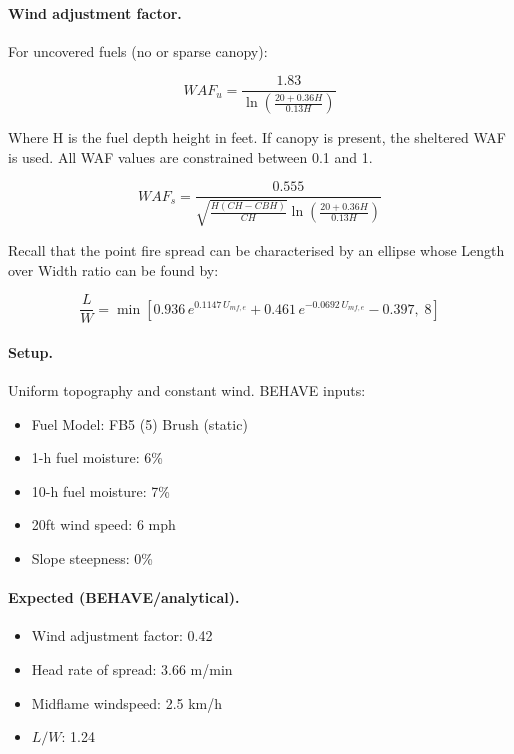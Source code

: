 \paragraph{Wind adjustment factor.} For uncovered fuels (no or sparse canopy):

\begin{equation}
WAF_u = 
\frac{1.83}{
\ln\left(
\frac{20 + 0.36H}{0.13H}
\right)}
\end{equation}

Where H is the fuel depth height in feet. If canopy is present, the sheltered WAF is used. All WAF values are constrained between 0.1 and 1. 

\begin{equation}
WAF_s = 
\frac{0.555}{\sqrt{\frac{H(CH-CBH)}{CH}}
\ln\left(
\frac{20 + 0.36H}{0.13H}
\right)}
\end{equation}

Recall that the point fire spread can be characterised by an ellipse whose Length over Width ratio can be found by:

\begin{equation}
    \frac{L}{W} = \min \left[ 
0.936\, e^{0.1147\, U_{mf,e}} 
+ 0.461\, e^{-0.0692\, U_{mf,e}} 
- 0.397,\; 8
\right]
\end{equation}
\paragraph{Setup.} Uniform topography and constant wind. BEHAVE inputs:


\begin{itemize}
    \item Fuel Model: FB5 (5) Brush (static)
    \item 1-h fuel moisture: 6\%
    \item 10-h fuel moisture: 7\%
    \item 20ft wind speed: 6 mph
    \item Slope steepness: 0\%
\end{itemize}
\paragraph{Expected (BEHAVE/analytical).}


\begin{itemize}
    \item Wind adjustment factor: 0.42
    \item Head rate of spread: 3.66 m/min
    \item Midflame windspeed: 2.5 km/h
    \item $L/W$: 1.24
\end{itemize}

